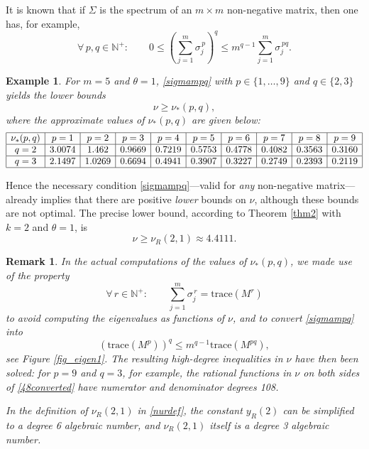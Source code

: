 \documentclass[a4paper]{article}
\newtheorem{remark}{Remark}
\newtheorem{example}{Example}
\newcommand{\te}{\theta}
\newcommand{\nplus}{\mathbb{N}^+}
\begin{document}
It is known \cite[Chapter 4]{nonnegmatr} that if $\Sigma$ is the spectrum of 
an $m \times m$ non-negative matrix, then one has,  for example, 
\begin{equation}\label{sigmampq}
\forall\, p, q \in\nplus:\quad\quad 0\le \left(\sum_{j=1}^m \sigma_j^{\,p}\right)^q\le m^{q-1} \sum_{j=1}^m \sigma_j^{\,p q}.
\end{equation}
\begin{example}\label{example2}
For $m=5$ and $\te=1$, \eqref{sigmampq} with  $p\in\{1,\ldots,9\}$ and $q\in\{2,3\}$ yields the lower bounds
\begin{equation}\label{nustartpq}
\nu\ge \nu_{*}(p,q),
\end{equation}
where the approximate values of $\nu_{*}(p,q)$ are given below:
\[
\begin{array}{|c|c|c|c|c|c|c|c|c|c|}
\hline
\nu_{*}(p,q) & p=1 & p=2 & p=3 & p=4 & p=5 & p=6 & p=7 & p=8 & p=9 \\
\hline
q=2 & 3.0074 & 1.462 & 0.9669 & 0.7219 & 0.5753 & 0.4778 & 0.4082 & 0.3563 & 0.3160 \\
\hline
q=3 & 2.1497 & 1.0269 & 0.6694  & 0.4941 & 0.3907 & 0.3227  & 0.2749  & 0.2393  &  0.2119 \\
\hline
\end{array}
\]
\end{example}
Hence the necessary condition \eqref{sigmampq}---valid for \emph{any} non-negative matrix---already 
implies that there are positive \emph{lower} bounds on $\nu$, although these bounds are not optimal. The precise lower bound, according to Theorem \ref{thm2} with $k=2$ and $\te=1$, is
\[
\nu\ge \nu_R(2,1)\approx 4.4111.
\]
\begin{remark}
In the actual computations of the values of $\nu_{*}(p,q)$, we made use of the property 
\[
\forall\, r\in\nplus:\quad\quad\sum_{j=1}^m \sigma_j^{\,r}=\mathrm{trace}(M^r)\] 
to avoid computing the eigenvalues as functions of $\nu$, and to convert \eqref{sigmampq} into
\begin{equation}\label{48converted}
\left(\mathrm{trace}(M^p)\right)^q\le m^{q-1} \mathrm{trace}(M^{p q}),
\end{equation}
see Figure \ref{fig_eigen1}. The resulting high-degree inequalities in $\nu$ have then been solved: for $p=9$ and $q=3$, for example, the rational functions in $\nu$ on both sides of \eqref{48converted} have numerator and denominator degrees 108.

In the definition of $\nu_R(2,1)$ in \eqref{nurdef}, the constant $y_R(2)$ can be simplified to a degree 6 algebraic number, and $\nu_R(2,1)$ itself is a degree 3 algebraic number.
\end{remark}
\end{document}
